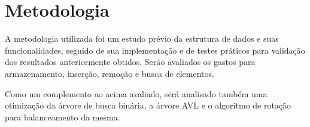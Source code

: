 \chapter{Metodologia}
\label{chap:metodologia}

A metodologia utilizada foi um estudo prévio da estrutura de dados e suas funcionalidades, seguido de sua implementação e de testes práticos para validação dos resultados anteriormente obtidos.
Serão avaliados os gastos para armazenamento, inserção, remoção e busca de elementos.

Como um complemento ao acima avaliado, será analisado também uma otimização da árvore de busca binária, a árvore AVL e o algoritmo de rotação para balanceamento da mesma.\\